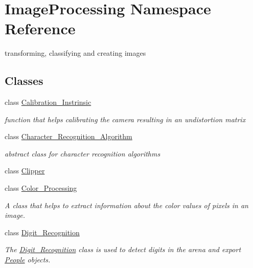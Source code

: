 \hypertarget{namespace_image_processing}{}\section{Image\+Processing Namespace Reference}
\label{namespace_image_processing}


transforming, classifying and creating images  


\subsection*{Classes}
\begin{DoxyCompactItemize}
\item 
class \mbox{\hyperlink{class_image_processing_1_1_calibration___instrinsic}{Calibration\+\_\+\+Instrinsic}}
\begin{DoxyCompactList}\small\item\em function that helps calibrating the camera resulting in an undistortion matrix \end{DoxyCompactList}\item 
class \mbox{\hyperlink{class_image_processing_1_1_character___recognition___algorithm}{Character\+\_\+\+Recognition\+\_\+\+Algorithm}}
\begin{DoxyCompactList}\small\item\em abstract class for character recognition algorithms \end{DoxyCompactList}\item 
class \mbox{\hyperlink{class_image_processing_1_1_clipper}{Clipper}}
\item 
class \mbox{\hyperlink{class_image_processing_1_1_color___processing}{Color\+\_\+\+Processing}}
\begin{DoxyCompactList}\small\item\em A class that helps to extract information about the color values of pixels in an image. \end{DoxyCompactList}\item 
class \mbox{\hyperlink{class_image_processing_1_1_digit___recognition}{Digit\+\_\+\+Recognition}}
\begin{DoxyCompactList}\small\item\em The \mbox{\hyperlink{class_image_processing_1_1_digit___recognition}{Digit\+\_\+\+Recognition}} class is used to detect digits in the arena and export \mbox{\hyperlink{class_people}{People}} objects. \end{DoxyCompactList}\item 

\end{DoxyCompactItemize}
